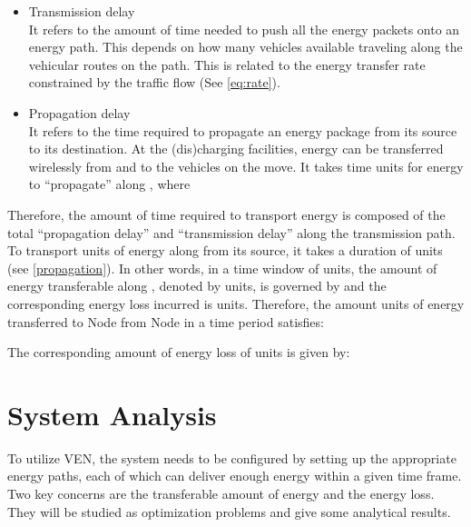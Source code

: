 \documentclass[journal]{IEEEtran}
\begin{document}
\begin{itemize}
	\item Transmission delay\\
	It refers to the amount of time needed to push all the energy packets onto an energy path. This depends on how many vehicles available traveling along the vehicular routes on the path. This is related to the energy transfer rate  constrained by the traffic flow  (See \eqref{eq:rate}).
	\item Propagation delay \\
	It refers to the time required to propagate an energy package from its source to its destination.
	At the (dis)charging facilities, energy can be transferred wirelessly from and to the vehicles on the move. 
It takes  time  units for energy to ``propagate'' along , where

\end{itemize}


Therefore, the amount of time required to transport energy is composed of the total ``propagation delay'' and ``transmission delay'' along the transmission path. To transport  units of energy along  from its source, it takes a duration of  units (see \eqref{propagation}). In other words, in a time window of  units, the amount of energy transferable along , denoted by  units, is governed by  and the corresponding energy loss incurred is  units.
Therefore, the amount  units of energy transferred to Node  from Node  in a time period  satisfies:

The corresponding amount of energy loss of  units is given by:



\section{System Analysis} \label{sec:formulation}

To utilize VEN, the system needs to be configured by setting up the appropriate energy paths, each of which can deliver enough energy within a given time frame. Two key concerns are the transferable amount of energy and the energy loss. They will be studied as optimization problems and give some analytical results.
\end{document}
